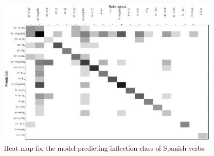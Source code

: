 \begin{figure}
  \includegraphics[width=0.85\textheight]{./figures/spanish/p-class-inflection1.pdf}
  \caption{Heat map for the model predicting inflection class of Spanish verbs}
  \label{fig:spanish-verbs-class-v}
\end{figure}


